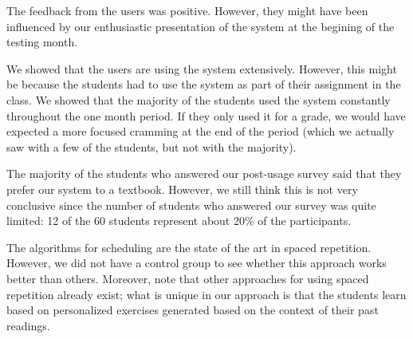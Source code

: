 The feedback from the users was positive. However, they might have been influenced by our enthusiastic presentation of the system at the begining of the testing month. 

We showed that the users are using the system extensively. However, this might be because the students had to use the system as part of their assignment in the class. We showed that the majority of the students used the system constantly throughout the one month period. If they only used it for a grade, we would have expected a more focused cramming at the end of the period (which we actually saw with a few of the students, but not with the majority). 

The majority of the students who answered our post-usage survey said that  they prefer our system to a textbook. However, we still think this is not very conclusive since the number of students who answered our survey was quite limited: 12 of the 60 students represent about 20\% of the participants. 


The algorithms for scheduling are the state of the art in spaced repetition. However, we did not have a control group to see whether this approach works better than others. Moreover, note that other approaches for using spaced repetition already exist; what is unique in our approach is that the students learn based on personalized exercises generated based on the context of their past readings.






